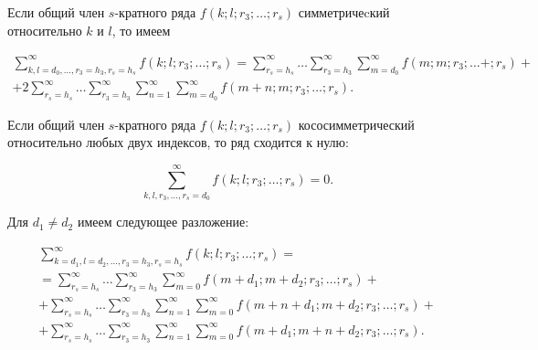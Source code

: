 
Если общий член $s$-кратного ряда $f(k;l;r_3;\ldots;r_s)$ симметричеcкий относительно $k$ и $l$, то имеем

\begin{multline*}

\sum_{k,l=d_0,\ldots,r_3=h_3,r_s=h_s}^\infty f(k;l;r_3;\ldots;r_s)

=\sum_{r_s=h_s}^\infty\ldots\sum_{r_3=h_3}^\infty\sum_{m=d_0}^\infty f(m;m;r_3;\ldots+ ;r_s)+\\

+2\sum_{r_s=h_s}^\infty\ldots\sum_{r_3=h_3}^\infty\sum_{n=1}^\infty\sum_{m=d_0}^\infty f(m+n;m;r_3;\ldots;r_s).

\end{multline*}

Если общий член $s$-кратного ряда $f(k;l;r_3;\ldots;r_s)$ кососимметрический относительно любых двух индексов, то ряд сходится к нулю:

$$\sum_{k,l,r_3,\ldots ,r_s=d_0}^\infty f(k;l;r_3;\ldots;r_s)=0.$$



Для $d_1\ne d_2$ имеем следующее разложение:

\begin{multline*}

\sum_{k=d_1,l=d_2,\ldots,r_3=h_3,r_s=h_s}^\infty f(k;l;r_3;\ldots;r_s)=

\\

=\sum_{r_s=h_s}^\infty\ldots\sum_{r_3=h_3}^\infty\sum_{m=0}^\infty f(m+d_1;m+d_2;r_3;\ldots ;r_s)+


\\


+\sum_{r_s=h_s}^\infty\ldots\sum_{r_3=h_3}^\infty\sum_{n=1}^\infty\sum_{m=0}^\infty f(m+n+d_1;m+d_2;r_3;\ldots;r_s)+

\\

+\sum_{r_s=h_s}^\infty\ldots\sum_{r_3=h_3}^\infty\sum_{n=1}^\infty\sum_{m=0}^\infty f(m+d_1;m+n+d_2;r_3;\ldots;r_s).

\end{multline*}



\smallskip






